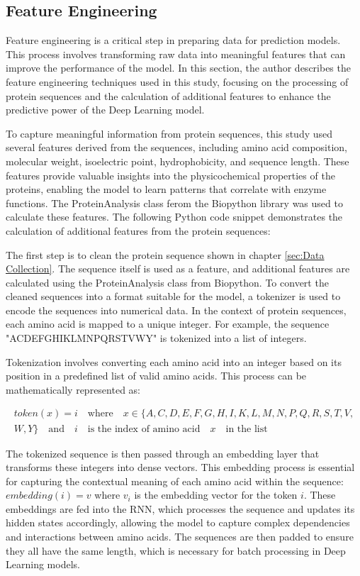 \subsection{Feature Engineering}
\label{sec:Feature Engineering}

Feature engineering is a critical step in preparing data for prediction models. This process involves transforming raw data into meaningful features that can improve the performance of the model. In this section, the author describes the feature engineering techniques used in this study, focusing on the processing of protein sequences and the calculation of additional features to enhance the predictive power of the Deep Learning model.

To capture meaningful information from protein sequences, this study used several features derived from the sequences, including amino acid composition, molecular weight, isoelectric point, hydrophobicity, and sequence length. These features provide valuable insights into the physicochemical properties of the proteins, enabling the model to learn patterns that correlate with enzyme functions. The ProteinAnalysis class ferom the Biopython library was used to calculate these features. The following Python code snippet demonstrates the calculation of additional features from the protein sequences:


The first step is to clean the protein sequence shown in chapter \ref{sec:Data Collection}. The sequence itself is used as a feature, and additional features are calculated using the ProteinAnalysis class from Biopython. To convert the cleaned sequences into a format suitable for the model, a tokenizer is used to encode the sequences into numerical data. In the context of protein sequences, each amino acid is mapped to a unique integer. For example, the sequence "ACDEFGHIKLMNPQRSTVWY" is tokenized into a list of integers. 

Tokenization involves converting each amino acid into an integer based on its position in a predefined list of valid amino acids. This process can be mathematically represented as:

\begin{align*}
    token(x)=i\quad\text{where}\quad x \in \{A, C, D, E, F, G, H, I, K, L, M, N, P, Q, R, S, T, V, \\
    W, Y\} \quad \text{and} \quad i \quad \text{is the index of amino acid} \quad x \quad \text{in the list}
\end{align*}

The tokenized sequence is then passed through an embedding layer that transforms these integers into dense vectors. This embedding process is essential for capturing the contextual meaning of each amino acid within the sequence:
$embedding(i) = v$ where $v_i$ is the embedding vector for the token $i$.
These embeddings are fed into the RNN, which processes the sequence and updates its hidden states accordingly, allowing the model to capture complex dependencies and interactions between amino acids. The sequences are then padded to ensure they all have the same length, which is necessary for batch processing in Deep Learning models.

